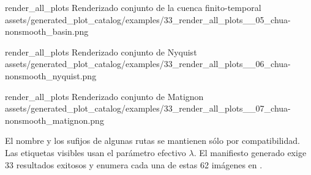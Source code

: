 \plotcatalogextra
  {render_all_plots}
  {Renderizado conjunto de la cuenca finito-temporal}
  {assets/generated_plot_catalog/examples/33_render_all_plots__05_chua-nonsmooth_basin.png}

\plotcatalogextra
  {render_all_plots}
  {Renderizado conjunto de Nyquist}
  {assets/generated_plot_catalog/examples/33_render_all_plots__06_chua-nonsmooth_nyquist.png}

\plotcatalogextra
  {render_all_plots}
  {Renderizado conjunto de Matignon}
  {assets/generated_plot_catalog/examples/33_render_all_plots__07_chua-nonsmooth_matignon.png}

\noindent
El nombre  y los sufijos
 de algunas rutas se mantienen sólo por compatibilidad. Las
etiquetas visibles usan el parámetro efectivo \(\lambda\). El manifiesto
generado exige 33 resultados exitosos y enumera cada una de estas 62 imágenes
en .
